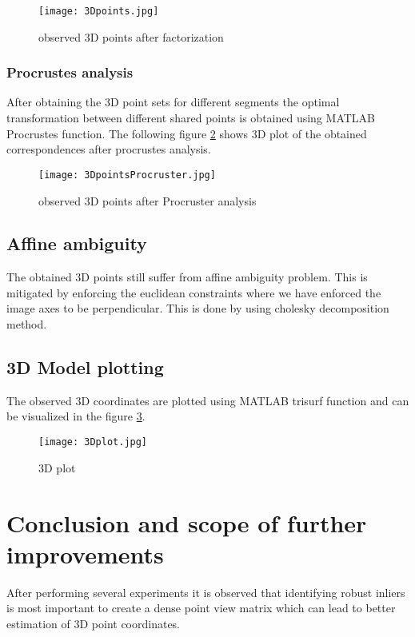\documentclass[11pt,twocolumn,pdftex]{article}
\begin{document}
\begin{figure}[h]
	\centering 
    \texttt{[image: 3Dpoints.jpg]}
    \caption{observed 3D points after factorization}
    \label{fig:3Dpoints}
\end{figure}



\subsubsection{Procrustes analysis}
After obtaining the 3D point sets for different segments the optimal transformation between different shared points is obtained using MATLAB Procrustes function. The following figure \ref{fig:3DpointsProcruster}  shows 3D plot of the obtained correspondences after procrustes analysis.

\begin{figure}[h]
	\centering 
    \texttt{[image: 3DpointsProcruster.jpg]}
    \caption{observed 3D points after Procruster analysis}
    \label{fig:3DpointsProcruster}
\end{figure}


\subsection{Affine ambiguity} \label{affineAmbiguity}
The obtained 3D points still suffer from affine ambiguity problem. This is mitigated by enforcing the euclidean constraints where we have enforced the image axes to be perpendicular. This is done by using cholesky decomposition method. 

\subsection{3D Model plotting} \label{3Dplot}
The observed 3D coordinates are plotted using MATLAB trisurf function and can be visualized in the figure \ref{fig:3Dplot}.

\begin{figure}[h]
	\centering 
    \texttt{[image: 3Dplot.jpg]}
    \caption{3D plot}
    \label{fig:3Dplot}
\end{figure}

\section{Conclusion and scope of further improvements} \label{conclusion}
After performing several experiments it is observed that identifying robust inliers is most important to create a dense point view matrix which can lead to better estimation of 3D point coordinates. 
\end{document}
